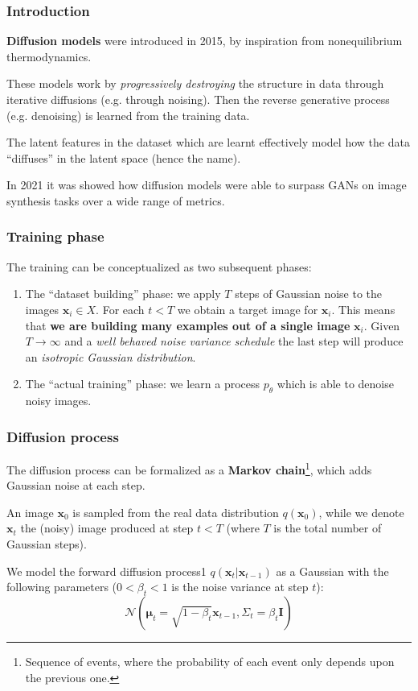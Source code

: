 \begin{frame}
    \frametitle{Introduction}
    \textbf{Diffusion models} were introduced in 2015, by inspiration from nonequilibrium thermodynamics.

    These models work by \emph{progressively destroying} the structure in data through iterative diffusions (e.g. through noising). Then the reverse generative process (e.g. denoising) is learned from the training data.

    The latent features in the dataset which are learnt effectively model how the data ``diffuses'' in the latent space (hence the name).


    In 2021 it was showed how diffusion models were able to surpass GANs on image synthesis tasks over a wide range of metrics. \cite{diffusion-gan}
\end{frame}

\begin{frame}
    \frametitle{Training phase}

    The training can be conceptualized as two subsequent phases:
    \begin{enumerate}
        \item The ``dataset building'' phase: we apply $T$ steps of Gaussian noise to the images $\textbf{x}_i \in X$. For each $t < T$ we obtain a target image for $\textbf{x}_i$. This means that \textbf{we are building many examples out of a single image} $\textbf{x}_i$. Given $T \to \infty$ and a \emph{well behaved noise variance schedule} the last step will produce an \emph{isotropic Gaussian distribution}.
        \item The ``actual training'' phase: we learn a process $p_\theta$ which is able to denoise noisy images.
    \end{enumerate}
\end{frame}

\begin{frame}
    \frametitle{Diffusion process}
    The diffusion process can be formalized as a \textbf{Markov chain}\footnote{Sequence of events, where the probability of each event only depends upon the previous one.}, which adds Gaussian noise at each step.

    An image $\textbf{x}_0$ is sampled from the real data distribution $q(\textbf{x}_0)$, while we denote $\textbf{x}_t$ the (noisy) image produced at step $t < T$ (where $T$ is the total number of Gaussian steps).


    We model the forward diffusion process1 $q(\textbf{x}_t|\textbf{x}_{t-1})$ as a Gaussian with the following parameters ($0 < \beta_t < 1$ is the noise variance at step $t$):
    $$\mathcal{N}(\bm\mu_t=\sqrt{1-\beta_t}\textbf{x}_{t-1}, \Sigma_t = \beta_t \textbf{I})$$
\end{frame}

